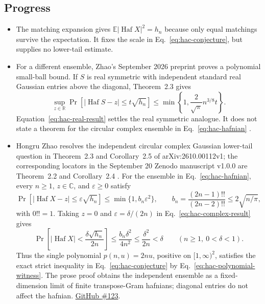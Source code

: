 \subsection*{Progress}

\begin{itemize}
  \item The matching expansion gives $\mathbb E|\operatorname{Haf}X|^2=h_n$ because only equal matchings survive the expectation.
It fixes the scale in Eq.~\eqref{eq:hac-conjecture}, but supplies no lower-tail estimate.

  \item For a different ensemble, Zhao's September 2026 preprint proves a polynomial small-ball bound.
If $S$ is real symmetric with independent standard real Gaussian entries above the diagonal, Theorem~2.3 gives
\begin{equation}
 \sup_{z\in\mathbb R}\Pr\!\left[
 |\operatorname{Haf}S-z|\leq t\sqrt{h_n}\right]
 \leq\min\!\left\{1,\frac{2}{\sqrt\pi}n^{3/8}t\right\}.
 \label{eq:hac-real-result}
\end{equation}
Equation~\eqref{eq:hac-real-result} settles the real symmetric analogue.
It does not state a theorem for the circular complex ensemble in Eq.~\eqref{eq:hac-hafnian} .

  \item Hongru Zhao resolves the independent circular complex Gaussian lower-tail question in Theorem~2.3 and Corollary~2.5 of arXiv:2610.00112v1; the corresponding locators in the September 20 Zenodo manuscript v1.0.0 are Theorem~2.2 and Corollary~2.4 .
For the ensemble in Eq.~\eqref{eq:hac-hafnian}, every $n\geq1$, $z\in\mathbb C$, and $\varepsilon\geq0$ satisfy
\begin{equation}
 \Pr\!\left[\lvert\operatorname{Haf}X-z\rvert\leq\varepsilon\sqrt{h_n}\right]
 \leq\min\{1,b_n\varepsilon^2\},
 \qquad b_n=\frac{(2n-1)!!}{(2n-2)!!}\leq2\sqrt{n/\pi},
 \label{eq:hac-complex-result}
\end{equation}
with $0!!=1$.
Taking $z=0$ and $\varepsilon=\delta/(2n)$ in Eq.~\eqref{eq:hac-complex-result} gives
\begin{equation}
 \Pr\!\left[\lvert\operatorname{Haf}X\rvert<\frac{\delta\sqrt{h_n}}{2n}\right]
 \leq\frac{b_n\delta^2}{4n^2}\leq\frac{\delta^2}{2n}<\delta
 \qquad(n\geq1,\ 0<\delta<1).
 \label{eq:hac-polynomial-witness}
\end{equation}
Thus the single polynomial $p(n,u)=2nu$, positive on $[1,\infty)^2$, satisfies the exact strict inequality in Eq.~\eqref{eq:hac-conjecture} by Eq.~\eqref{eq:hac-polynomial-witness}.
The prose proof obtains the independent ensemble as a fixed-dimension limit of finite transpose-Gram hafnians; diagonal entries do not affect the hafnian.
\href{https://github.com/Naixu-Guo/quantum-open-problems/issues/123}{GitHub \#123}.


\end{itemize}
